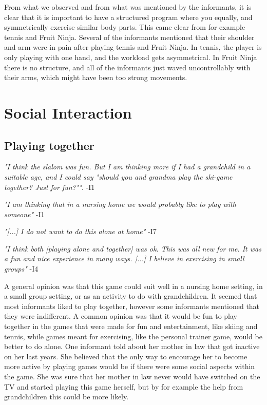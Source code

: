 From what we observed and from what was mentioned by the informants, it is clear that it is important to have a structured program where you equally, and symmetrically exercise similar body parts. This came clear from for example tennis and Fruit Ninja. Several of the informants mentioned that their shoulder and arm were in pain after playing tennis and Fruit Ninja. In tennis, the player is only playing with one hand, and the workload gets asymmetrical. In Fruit Ninja there is no structure, and all of the informants just waved uncontrollably with their arms, which might have been too strong movements.
    
\section{Social Interaction}
\subsection{Playing together}
\emph{"I think the slalom was fun. But I am thinking more if I had a grandchild in a suitable age, and I could say "should you and grandma play the ski-game together? Just for fun?""}. -I1

\emph{"I am thinking that in a nursing home we would probably like to play with someone"} -I1

\emph{"[...] I do not want to do this alone at home"} -I7

\emph{"I think both [playing alone and together] was ok. This was all new for me. It was a fun and nice experience in many ways. [...] I believe in  exercising in small groups"} -I4

A general opinion was that this game could suit well in a nursing home setting, in a small group setting, or as an activity to do with grandchildren. It seemed that most informants liked to play together, however some informants mentioned that they were indifferent. A common opinion was that it would be fun to play together in the games that were made for fun and entertainment, like skiing and tennis, while games meant for exercising, like the personal trainer game, would be better to do alone. One informant told about her mother in law that got inactive on her last years. She believed that the only way to encourage her to become more active by playing games would be if there were some social aspects within the game. She was sure that her mother in law never would have switched on the TV and started playing this game herself, but by for example the help from grandchildren this could be more likely.

